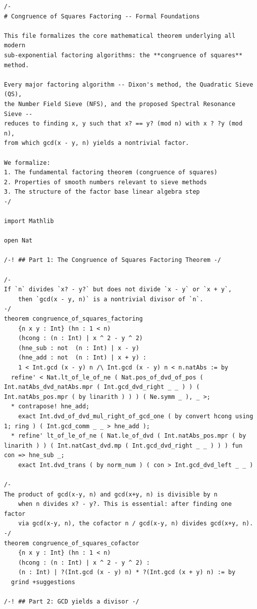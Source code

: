 \documentclass[11pt,twoside,openright]{book}
\theoremstyle{definition}
\theoremstyle{remark}
\begin{document}
\begin{lstlisting}[style=lean]
/-
# Congruence of Squares Factoring -- Formal Foundations

This file formalizes the core mathematical theorem underlying all modern
sub-exponential factoring algorithms: the **congruence of squares** method.

Every major factoring algorithm -- Dixon's method, the Quadratic Sieve (QS),
the Number Field Sieve (NFS), and the proposed Spectral Resonance Sieve --
reduces to finding x, y such that x? == y? (mod n) with x ? ?y (mod n),
from which gcd(x - y, n) yields a nontrivial factor.

We formalize:
1. The fundamental factoring theorem (congruence of squares)
2. Properties of smooth numbers relevant to sieve methods
3. The structure of the factor base linear algebra step
-/

import Mathlib

open Nat

/-! ## Part 1: The Congruence of Squares Factoring Theorem -/

/-
If `n` divides `x? - y?` but does not divide `x - y` or `x + y`,
    then `gcd(x - y, n)` is a nontrivial divisor of `n`.
-/
theorem congruence_of_squares_factoring
    {n x y : Int} (hn : 1 < n)
    (hcong : (n : Int) | x ^ 2 - y ^ 2)
    (hne_sub : not  (n : Int) | x - y)
    (hne_add : not  (n : Int) | x + y) :
    1 < Int.gcd (x - y) n /\ Int.gcd (x - y) n < n.natAbs := by
  refine' < Nat.lt_of_le_of_ne ( Nat.pos_of_dvd_of_pos ( Int.natAbs_dvd_natAbs.mpr ( Int.gcd_dvd_right _ _ ) ) ( Int.natAbs_pos.mpr ( by linarith ) ) ) ( Ne.symm _ ), _ >;
  * contrapose! hne_add;
    exact Int.dvd_of_dvd_mul_right_of_gcd_one ( by convert hcong using 1; ring ) ( Int.gcd_comm _ _ > hne_add );
  * refine' lt_of_le_of_ne ( Nat.le_of_dvd ( Int.natAbs_pos.mpr ( by linarith ) ) ( Int.natCast_dvd.mp ( Int.gcd_dvd_right _ _ ) ) ) fun con => hne_sub _;
    exact Int.dvd_trans ( by norm_num ) ( con > Int.gcd_dvd_left _ _ )

/-
The product of gcd(x-y, n) and gcd(x+y, n) is divisible by n
    when n divides x? - y?. This is essential: after finding one factor
    via gcd(x-y, n), the cofactor n / gcd(x-y, n) divides gcd(x+y, n).
-/
theorem congruence_of_squares_cofactor
    {n x y : Int} (hn : 1 < n)
    (hcong : (n : Int) | x ^ 2 - y ^ 2) :
    (n : Int) | ?(Int.gcd (x - y) n) * ?(Int.gcd (x + y) n) := by
  grind +suggestions

/-! ## Part 2: GCD yields a divisor -/


\end{lstlisting}
\end{document}
